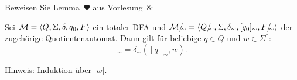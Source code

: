 \newcommand{\simquot}[1]{#1/_{\!\!{\sim}}}

\begin{exercise}
  Beweisen Sie Lemma~$\varheartsuit$ aus Vorlesung~8:

  \begin{center}
    Sei $\mathcal{M} = \langle{Q, \Sigma, \delta, q_{0}, F}\rangle$ ein totaler DFA und
    $\simquot{\mathcal{M}} = \tuple{\simquot{Q}, \Sigma, \delta_{\sim},
      [q_{0}]_{\sim}, \simquot{F}}$ der zugehörige Quotientenautomat. Dann gilt für beliebige $q \in Q$ und
    $w \in \Sigma^{*}$:
    \begin{equation*}
      [\delta(q, w)]_{\sim} = \delta_{\sim}([q]_{\sim}, w).
    \end{equation*}
  \end{center}

  Hinweis: Induktion über $|w|$.
\end{exercise}

